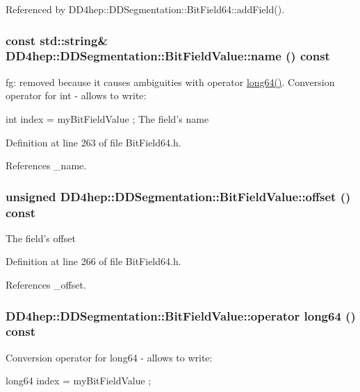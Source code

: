 Referenced by DD4hep::DDSegmentation::BitField64::addField().\hypertarget{class_d_d4hep_1_1_d_d_segmentation_1_1_bit_field_value_a7c3d9380d0271421162b597fbe519a49}{
\subsubsection[{name}]{\setlength{\rightskip}{0pt plus 5cm}const std::string\& DD4hep::DDSegmentation::BitFieldValue::name () const}}
\label{class_d_d4hep_1_1_d_d_segmentation_1_1_bit_field_value_a7c3d9380d0271421162b597fbe519a49}
fg: removed because it causes ambiguities with operator \hyperlink{namespace_d_d4hep_ac2a70e722b33dc7ddaa20db8954ac836}{long64()}. Conversion operator for int -\/ allows to write:\par
 int index = myBitFieldValue ; The field's name 

Definition at line 263 of file BitField64.h.

References \_\-name.\hypertarget{class_d_d4hep_1_1_d_d_segmentation_1_1_bit_field_value_a52d8af6f5001a14f1259d1cd4bc40497}{
\subsubsection[{offset}]{\setlength{\rightskip}{0pt plus 5cm}unsigned DD4hep::DDSegmentation::BitFieldValue::offset () const}}
\label{class_d_d4hep_1_1_d_d_segmentation_1_1_bit_field_value_a52d8af6f5001a14f1259d1cd4bc40497}
The field's offset 

Definition at line 266 of file BitField64.h.

References \_\-offset.\hypertarget{class_d_d4hep_1_1_d_d_segmentation_1_1_bit_field_value_a7f4fe22888949eeeb35d9c0a487d7d52}{
\subsubsection[{operator long64}]{\setlength{\rightskip}{0pt plus 5cm}DD4hep::DDSegmentation::BitFieldValue::operator {\bf long64} () const}}
\label{class_d_d4hep_1_1_d_d_segmentation_1_1_bit_field_value_a7f4fe22888949eeeb35d9c0a487d7d52}
Conversion operator for long64 -\/ allows to write:\par
 long64 index = myBitFieldValue ; 

